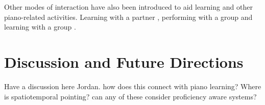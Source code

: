 \documentclass[sigchi, review]{acmart}
\begin{document}

Other modes of interaction have also been introduced to aid learning and other piano-related activities. Learning with a partner \cite{xiao2011duet}, performing with a group \cite{gerry2019adept} and learning with a group \cite{cai2019design}. %

\section{Discussion and Future Directions}
Have a discussion here Jordan. how does this connect with piano learning? 
Where is spatiotemporal pointing?
can any of these consider proficiency aware systems? 
\label{sec: discuss}





\balance


\end{document}
